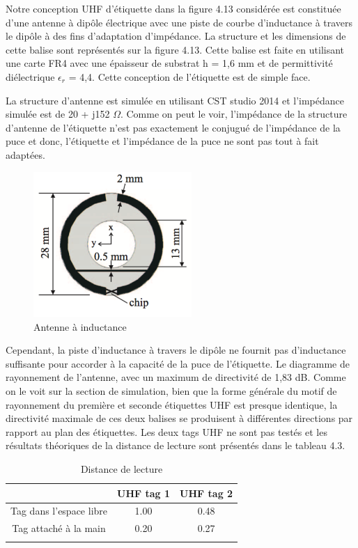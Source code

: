 \documentclass[11pt, a4paper, twoside]{book}
\begin{document}
Notre conception UHF d'étiquette dans la figure 4.13 considérée est constituée d'une antenne à dipôle électrique avec une piste de courbe d'inductance à travers le dipôle à des fins d'adaptation d'impédance. La structure et les dimensions de cette balise sont représentés sur la figure 4.13. Cette balise est faite en utilisant une carte FR4 avec une épaisseur de substrat h = 1,6 mm et de permittivité diélectrique \(\epsilon_{r}\) = 4,4. Cette conception de l'étiquette est de simple face.

 La structure d'antenne est simulée en utilisant CST studio 2014 et l'impédance simulée est de 20 + j152 \(\Omega\). Comme on peut le voir, l'impédance de la structure d'antenne de l'étiquette n'est pas exactement le conjugué de l'impédance de la puce \cite{alien} et donc, l'étiquette et l'impédance de la puce ne sont pas tout à fait adaptées.
\begin{figure}[H]
\centering
\includegraphics[width=6cm]{dofi}
\caption{Antenne à inductance}
\end{figure}

Cependant, la piste d'inductance à travers le dipôle ne fournit pas d'inductance suffisante pour accorder à la capacité de la puce de l'étiquette. Le diagramme de rayonnement de l'antenne, avec un maximum de directivité de 1,83 dB. Comme on le voit sur la section de simulation, bien que la forme générale du motif de rayonnement du première et seconde étiquettes UHF est presque identique, la directivité maximale de ces deux balises se produisent à différentes directions par rapport au plan des étiquettes. Les deux tags UHF ne sont pas testés et les résultats théoriques de la distance de lecture sont présentés dans le tableau 4.3.\\

\begin{longtable}[c]{| c | c | c |}
 \hline
  & UHF tag 1 & UHF tag 2 \\
 \hline
 Tag dans l'espace libre & 1.00 & 0.48\\
 \hline
 Tag attaché à la main  & 0.20 & 0.27\\
 \hline
\caption{Distance de lecture}
\end{longtable}
\end{document}
